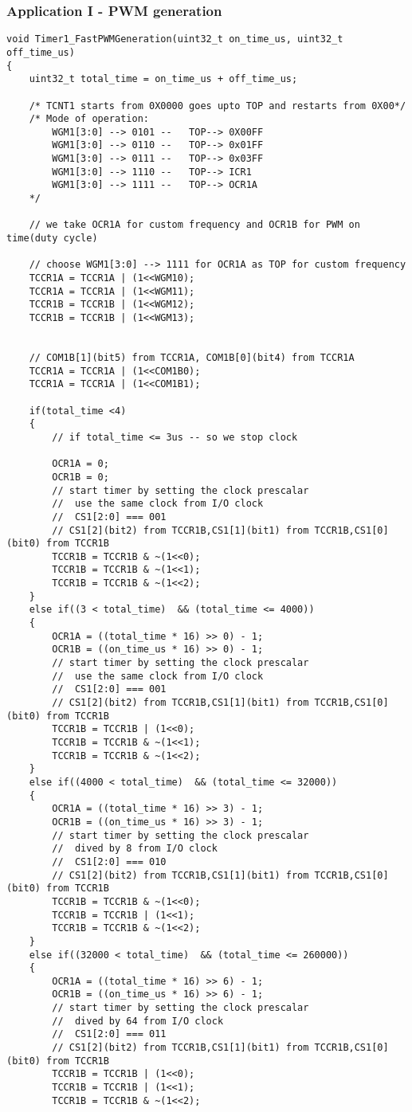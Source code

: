 \subsubsection{Application I - PWM generation}
\begin{verbatim}
void Timer1_FastPWMGeneration(uint32_t on_time_us, uint32_t off_time_us)
{
	uint32_t total_time = on_time_us + off_time_us;
	
	/* TCNT1 starts from 0X0000 goes upto TOP and restarts from 0X00*/
	/* Mode of operation:
		WGM1[3:0] --> 0101 --	TOP--> 0X00FF
		WGM1[3:0] --> 0110 --	TOP--> 0x01FF
		WGM1[3:0] --> 0111 --	TOP--> 0x03FF
		WGM1[3:0] --> 1110 --	TOP--> ICR1
		WGM1[3:0] --> 1111 --	TOP--> OCR1A
	*/
	
	// we take OCR1A for custom frequency and OCR1B for PWM on time(duty cycle)
	
	// choose WGM1[3:0] --> 1111 for OCR1A as TOP for custom frequency
	TCCR1A = TCCR1A | (1<<WGM10);
	TCCR1A = TCCR1A | (1<<WGM11);
	TCCR1B = TCCR1B | (1<<WGM12);
	TCCR1B = TCCR1B | (1<<WGM13);
	

	// COM1B[1](bit5) from TCCR1A, COM1B[0](bit4) from TCCR1A
	TCCR1A = TCCR1A | (1<<COM1B0);
	TCCR1A = TCCR1A | (1<<COM1B1);
	
	if(total_time <4)
	{
		// if total_time <= 3us -- so we stop clock
		
		OCR1A = 0;
		OCR1B = 0;
		// start timer by setting the clock prescalar
		//  use the same clock from I/O clock
		//  CS1[2:0] === 001
		// CS1[2](bit2) from TCCR1B,CS1[1](bit1) from TCCR1B,CS1[0](bit0) from TCCR1B
		TCCR1B = TCCR1B & ~(1<<0);
		TCCR1B = TCCR1B & ~(1<<1);
		TCCR1B = TCCR1B & ~(1<<2);
	}
	else if((3 < total_time)  && (total_time <= 4000))
	{
		OCR1A = ((total_time * 16) >> 0) - 1;
		OCR1B = ((on_time_us * 16) >> 0) - 1;
		// start timer by setting the clock prescalar
		//  use the same clock from I/O clock
		//  CS1[2:0] === 001
		// CS1[2](bit2) from TCCR1B,CS1[1](bit1) from TCCR1B,CS1[0](bit0) from TCCR1B
		TCCR1B = TCCR1B | (1<<0);
		TCCR1B = TCCR1B & ~(1<<1);
		TCCR1B = TCCR1B & ~(1<<2);
	}
	else if((4000 < total_time)  && (total_time <= 32000))
	{
		OCR1A = ((total_time * 16) >> 3) - 1;
		OCR1B = ((on_time_us * 16) >> 3) - 1;
		// start timer by setting the clock prescalar
		//  dived by 8 from I/O clock
		//  CS1[2:0] === 010
		// CS1[2](bit2) from TCCR1B,CS1[1](bit1) from TCCR1B,CS1[0](bit0) from TCCR1B
		TCCR1B = TCCR1B & ~(1<<0);
		TCCR1B = TCCR1B | (1<<1);
		TCCR1B = TCCR1B & ~(1<<2);
	}
	else if((32000 < total_time)  && (total_time <= 260000))
	{
		OCR1A = ((total_time * 16) >> 6) - 1;
		OCR1B = ((on_time_us * 16) >> 6) - 1;
		// start timer by setting the clock prescalar
		//  dived by 64 from I/O clock
		//  CS1[2:0] === 011
		// CS1[2](bit2) from TCCR1B,CS1[1](bit1) from TCCR1B,CS1[0](bit0) from TCCR1B
		TCCR1B = TCCR1B | (1<<0);
		TCCR1B = TCCR1B | (1<<1);
		TCCR1B = TCCR1B & ~(1<<2);
		

\end{verbatim}
